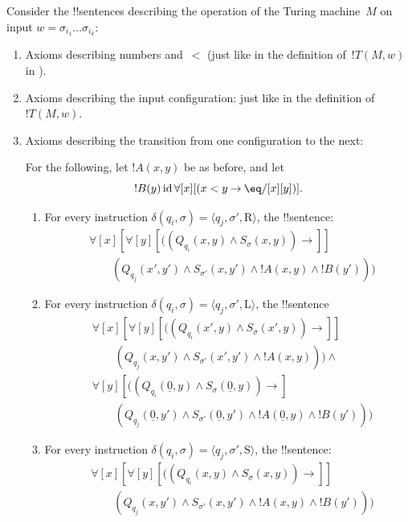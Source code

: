 \documentclass[10pt,a4paper]{article}
\makeatletter
\theoremstyle{plain}
\theoremstyle{definition}
\theoremstyle{remark}
\newcommand*{\ollabel}[1]{\label{#1}}
\newcommand{\olref}{\@ifnextchar[{\olref@i}{\olref@final}}
\def\olref@i[#1]{\@ifnextchar[{\olref@ii}{\olref@final}}
\def\olref@ii[#1]{\@ifnextchar[{\olref@iii}{\olref@final}}
\def\olref@iii[#1]{\olref@final}
\def\olref@final#1{\ref{#1}}
\providecommand{\lif}{\mathbin{\rightarrow}}
\providecommand{\lforall}{\mathord{\forall}}
\providecommand{\Obj}{}
\providecommand{\tuple}[1]{\langle #1 \rangle}
\providecommand{\num}[1]{\underline{#1}}
\providecommand{\TMstay}{\mathrm{S}}
\providecommand{\TMright}{\mathrm{R}}
\providecommand{\TMleft}{\mathrm{L}}
\providecommand{\ident}{\operatorname{id}}
\makeatother
\begin{document}
Consider the !!{sentence}s describing the operation of the Turing
machine~$M$ on input $w = \sigma_{i_1}\dots\sigma_{i_k}$:
\begin{enumerate}
\item Axioms describing numbers and~$<$ (just like in the definition
of~$!T(M,w)$ in \olref[rep]{sec}).
\item Axioms describing the input configuration: just like in the definition
of~$!T(M,w)$.
\item Axioms describing the transition from one configuration to
  the next:

For the following, let $!A(x, y)$ be as before, and let
\[
  !B(y) \ident \lforall[x][(x < y \lif \eq/[x][y])].
\]
\begin{enumerate}
\item \ollabel{rep-right} For every instruction $\delta(q_i, \sigma) =
  \tuple{q_j, \sigma', \TMright}$, the !!{sentence}:
\begin{align*}
& \lforall[x][\lforall[y][(
   (\Obj Q_{q_i}(x, y) \land \Obj S_{\sigma}(x, y)) \lif {}]] \\
&\qquad   (\Obj Q_{q_j}(x', y') \land \Obj S_{\sigma'}(x, y') \land
!A(x, y) \land !B(y')))
\end{align*}
\item \ollabel{rep-left} For every instruction $\delta(q_i, \sigma) =
  \tuple{q_j, \sigma', \TMleft}$, the !!{sentence}
\begin{align*}
& \lforall[x][\lforall[y][
    ((\Obj Q_{q_i}(x', y) \land \Obj S_{\sigma}(x', y)) \lif {}]]\\
& \qquad   (\Obj Q_{q_j}(x, y') \land \Obj S_{\sigma'}(x', y') \land
!A(x, y))) \land {}\\
& \lforall[y][((\Obj Q_{q_i}(\num{0}, y) \land \Obj S_{\sigma}(\num{0},
    y)) \lif {}]\\
& \qquad (\Obj Q_{q_j}(\num{0}, y') \land \Obj S_{\sigma'}(\num{0},
  y') \land !A(\num{0}, y) \land !B(y')))
\end{align*}
\item \ollabel{rep-stay} For every instruction $\delta(q_i, \sigma) =
  \tuple{q_j, \sigma', \TMstay}$, the !!{sentence}:
\begin{align*}
& \lforall[x][\lforall[y][(
   (\Obj Q_{q_i}(x, y) \land \Obj S_{\sigma}(x, y)) \lif {}]] \\
&\qquad (\Obj Q_{q_j}(x, y') \land \Obj S_{\sigma'}(x, y') \land
!A(x, y) \land !B(y')))
\end{align*}
\end{enumerate}

\end{enumerate}
\end{document}
